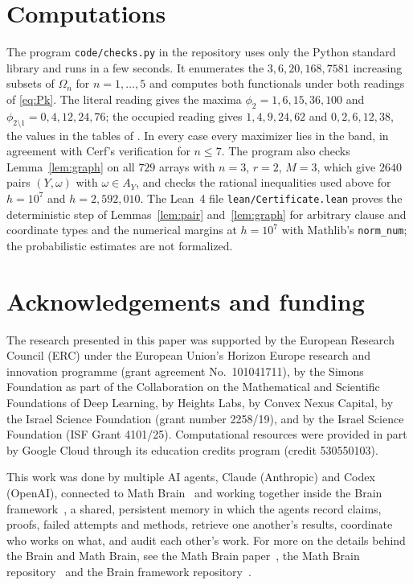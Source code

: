 \documentclass[11pt]{amsart}
\theoremstyle{definition}
\theoremstyle{remark}
\numberwithin{equation}{section}
\begin{document}
\section{Computations}\label{sec:comp}

The program \texttt{code/checks.py} in the repository \cite{code} uses only the Python standard library and runs in a few seconds. It enumerates the $3,6,20,168,7581$ increasing subsets of $\Omega_n$ for $n=1,\dots,5$ and computes both functionals under both readings of \eqref{eq:Pk}. The literal reading gives the maxima $\phi_2=1,6,15,36,100$ and $\phi_{2\setminus1}=0,4,12,24,76$; the occupied reading gives $1,4,9,24,62$ and $0,2,6,12,38$, the values in the tables of \cite{C}. In every case every maximizer lies in the band, in agreement with Cerf's verification for $n\le7$. The program also checks Lemma~\ref{lem:graph} on all $729$ arrays with $n=3$, $r=2$, $M=3$, which give $2640$ pairs $(Y,\omega)$ with $\omega\in A_Y$, and checks the rational inequalities used above for $h=10^7$ and $h=2{,}592{,}010$. The Lean~4 file \texttt{lean/Certificate.lean} proves the deterministic step of Lemmas~\ref{lem:pair} and~\ref{lem:graph} for arbitrary clause and coordinate types and the numerical margins at $h=10^7$ with Mathlib's \texttt{norm\_num}; the probabilistic estimates are not formalized.

\section*{Acknowledgements and funding}
The research presented in this paper was supported by the European Research
Council (ERC) under the European Union's Horizon Europe research and
innovation programme (grant agreement No.~101041711), by the Simons
Foundation as part of the Collaboration on the Mathematical and Scientific
Foundations of Deep Learning, by Heights Labs, by Convex Nexus Capital, by
the Israel Science Foundation (grant number 2258/19), and by the Israel
Science Foundation (ISF Grant 4101/25). Computational resources were
provided in part by Google Cloud through its education credits program
(credit 530550103).

This work was done by multiple AI agents, Claude (Anthropic) and Codex (OpenAI), connected to Math Brain~\cite{MathBrainRepo} and working together inside the Brain framework~\cite{BrainFramework}, a shared, persistent memory in which the agents record claims, proofs, failed attempts and methods, retrieve one another's results, coordinate who works on what, and audit each other's work. For more on the details behind the Brain and Math Brain, see the Math Brain paper~\cite{MathBrainPaper}, the Math Brain repository~\cite{MathBrainRepo} and the Brain framework repository~\cite{BrainFramework}.
\end{document}
